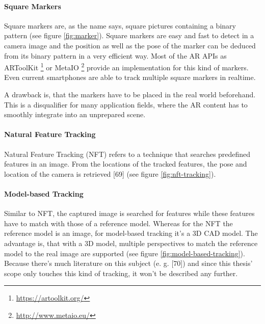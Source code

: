 \paragraph{Square Markers}
Square markers are, as the name says, square pictures containing a binary pattern (see figure \ref{fig:marker}). Square markers are easy and fast to detect in a camera image and the position as well as the pose of the marker can be deduced from its binary pattern in a very efficient way. Most of the AR APIs as ARToolKit \footnote{\url{https://artoolkit.org/}} or MetaIO \footnote{\url{http://www.metaio.eu/}} provide an implementation for this kind of markers. Even current smartphones are able to track multiple square markers in realtime.

A drawback is, that the markers have to be placed in the real world beforehand. This is a disqualifier for many application fields, where the AR content has to smoothly integrate into an unprepared scene.

\paragraph{Natural Feature Tracking}
Natural Feature Tracking (NFT) refers to a technique that searches predefined features in an image. From the locations of the tracked features, the pose and location of the camera is retrieved [69] (see figure \ref{fig:nft-tracking}).

\paragraph{Model-based Tracking}
Similar to NFT, the captured image is searched for features while these features have to match with those of a reference model. Whereas for the NFT the reference model is an image, for model-based tracking it’s a 3D CAD model. The advantage is, that with a 3D model, multiple perspectives to match the reference model to the real image are supported (see figure \ref{fig:model-based-tracking}).
Because there’s much literature on this subject (e. g. [70]) and since this thesis' scope only touches this kind of tracking, it won’t be described any further.

